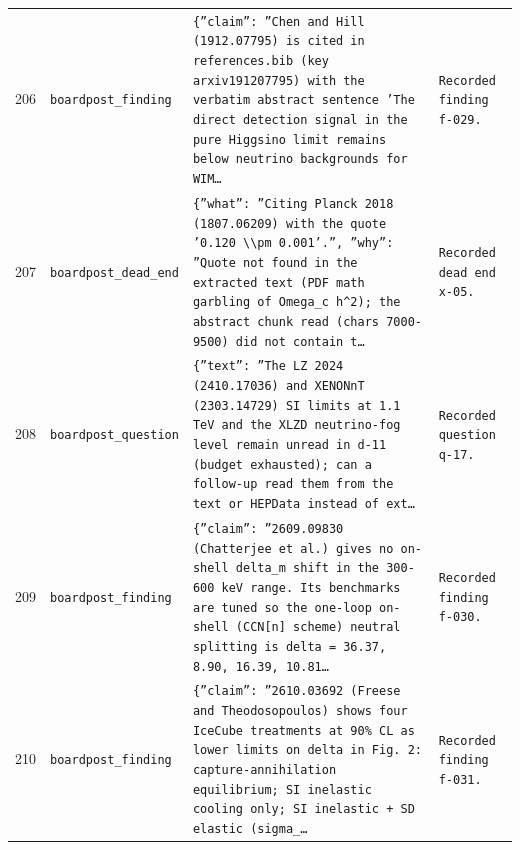 \documentclass[11pt,a4paper]{article}
\begin{document}
\begin{longtable}{@{}p{}p{}p{}p{}@{}}
206 & \texttt{board}\newline\texttt{post\_\allowbreak{}finding} & \texttt{\{''claim'':\allowbreak{} ''Chen and Hill (1912.07795)\allowbreak{} is cited in references.bib (key arxiv191207795)\allowbreak{} with the verbatim abstract sentence 'The direct detection signal in the pure Higgsino limit remains below neutrino backgrounds for WIM\ldots{}\allowbreak{}} & \texttt{Recorded finding f-029.} \\
207 & \texttt{board}\newline\texttt{post\_\allowbreak{}dead\_\allowbreak{}end} & \texttt{\{''what'':\allowbreak{} ''Citing Planck 2018 (1807.06209)\allowbreak{} with the quote '0.120 \textbackslash{}\allowbreak{}\textbackslash{}\allowbreak{}pm 0.001'.'',\allowbreak{} ''why'':\allowbreak{} ''Quote not found in the extracted text (PDF math garbling of Omega\_\allowbreak{}c h\textasciicircum{}\allowbreak{}2)\allowbreak{};\allowbreak{} the abstract chunk read (chars 7000-9500)\allowbreak{} did not contain t\ldots{}\allowbreak{}} & \texttt{Recorded dead end x-05.} \\
208 & \texttt{board}\newline\texttt{post\_\allowbreak{}question} & \texttt{\{''text'':\allowbreak{} ''The LZ 2024 (2410.17036)\allowbreak{} and XENONnT (2303.14729)\allowbreak{} SI limits at 1.1 TeV and the XLZD neutrino-fog level remain unread in d-11 (budget exhausted)\allowbreak{};\allowbreak{} can a follow-up read them from the text or HEPData instead of ext\ldots{}\allowbreak{}} & \texttt{Recorded question q-17.} \\
209 & \texttt{board}\newline\texttt{post\_\allowbreak{}finding} & \texttt{\{''claim'':\allowbreak{} ''2609.09830 (Chatterjee et al.)\allowbreak{} gives no on-shell delta\_\allowbreak{}m shift in the 300-600 keV range. Its benchmarks are tuned so the one-loop on-shell (CCN[n]\allowbreak{} scheme)\allowbreak{} neutral splitting is delta =\allowbreak{} 36.37,\allowbreak{} 8.90,\allowbreak{} 16.39,\allowbreak{} 10.81\ldots{}\allowbreak{}} & \texttt{Recorded finding f-030.} \\
210 & \texttt{board}\newline\texttt{post\_\allowbreak{}finding} & \texttt{\{''claim'':\allowbreak{} ''2610.03692 (Freese and Theodosopoulos)\allowbreak{} shows four IceCube treatments at 90\% CL as lower limits on delta in Fig. 2:\allowbreak{} capture-annihilation equilibrium;\allowbreak{} SI inelastic cooling only;\allowbreak{} SI inelastic + SD elastic (sigma\_\allowbreak{}\ldots{}\allowbreak{}} & \texttt{Recorded finding f-031.} \\

\end{longtable}
\end{document}
